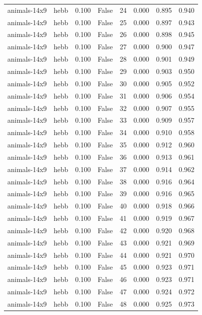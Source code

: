 \begin{tabular}{llrrrrrr}
animals-14x9 & hebb & 0.100 & False & 24 & 0.000 & 0.895 & 0.940 \\
animals-14x9 & hebb & 0.100 & False & 25 & 0.000 & 0.897 & 0.943 \\
animals-14x9 & hebb & 0.100 & False & 26 & 0.000 & 0.898 & 0.945 \\
animals-14x9 & hebb & 0.100 & False & 27 & 0.000 & 0.900 & 0.947 \\
animals-14x9 & hebb & 0.100 & False & 28 & 0.000 & 0.901 & 0.949 \\
animals-14x9 & hebb & 0.100 & False & 29 & 0.000 & 0.903 & 0.950 \\
animals-14x9 & hebb & 0.100 & False & 30 & 0.000 & 0.905 & 0.952 \\
animals-14x9 & hebb & 0.100 & False & 31 & 0.000 & 0.906 & 0.954 \\
animals-14x9 & hebb & 0.100 & False & 32 & 0.000 & 0.907 & 0.955 \\
animals-14x9 & hebb & 0.100 & False & 33 & 0.000 & 0.909 & 0.957 \\
animals-14x9 & hebb & 0.100 & False & 34 & 0.000 & 0.910 & 0.958 \\
animals-14x9 & hebb & 0.100 & False & 35 & 0.000 & 0.912 & 0.960 \\
animals-14x9 & hebb & 0.100 & False & 36 & 0.000 & 0.913 & 0.961 \\
animals-14x9 & hebb & 0.100 & False & 37 & 0.000 & 0.914 & 0.962 \\
animals-14x9 & hebb & 0.100 & False & 38 & 0.000 & 0.916 & 0.964 \\
animals-14x9 & hebb & 0.100 & False & 39 & 0.000 & 0.916 & 0.965 \\
animals-14x9 & hebb & 0.100 & False & 40 & 0.000 & 0.918 & 0.966 \\
animals-14x9 & hebb & 0.100 & False & 41 & 0.000 & 0.919 & 0.967 \\
animals-14x9 & hebb & 0.100 & False & 42 & 0.000 & 0.920 & 0.968 \\
animals-14x9 & hebb & 0.100 & False & 43 & 0.000 & 0.921 & 0.969 \\
animals-14x9 & hebb & 0.100 & False & 44 & 0.000 & 0.921 & 0.970 \\
animals-14x9 & hebb & 0.100 & False & 45 & 0.000 & 0.923 & 0.971 \\
animals-14x9 & hebb & 0.100 & False & 46 & 0.000 & 0.923 & 0.971 \\
animals-14x9 & hebb & 0.100 & False & 47 & 0.000 & 0.924 & 0.972 \\
animals-14x9 & hebb & 0.100 & False & 48 & 0.000 & 0.925 & 0.973 \\

\end{tabular}
